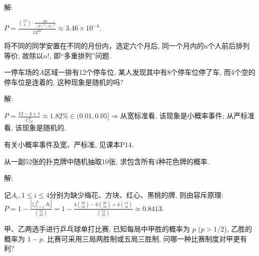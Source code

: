 \documentclass[standard]{ExBook}
\renewenvironment{shaded}{%
  \def\FrameCommand{\fboxsep=\FrameSep \colorbox{shadecolor}}%
  \MakeFramed{\advance\hsize-\width \FrameRestore}%
}{%
  \endMakeFramed
}
\begin{document}
\begin{qitems}
\vspace{\dimexpr2.5cm-5em\relax}

解:

$P=\displaystyle{\frac{\binom{12}{6}\cdot\frac{30!}{(2!)^6 (3!)^6}}{12^{30}}}\approx3.46\times10^{-4}$.

\textcolor{themeColor}{\selectfont {} 将不同的同学安置在不同的月份内，选定六个月后, 同一个月内的n个人前后排列等价, 故除以$n!$, 即“多重排列”问题.}

\vspace{2.5cm-5em}

    \begin{bbox}
    \begin{shaded}
        \qitem
一停车场的$A$区域一排有12个停车位, 某人发现其中有8个停车位停了车, 而4个空的停车位是连着的, 这种现象是随机的吗?
    \end{shaded}
    \end{bbox}

\vspace{\dimexpr2.5cm-5em\relax}

解:

$P=\displaystyle{\frac{12-4+1}{C_{12}^{4}}}\approx1.82\%\in(0.01,0.05]$$\Longrightarrow$从宽标准看, 该现象是小概率事件; 从严标准看, 该现象是随机的.

\textcolor{themeColor}{\selectfont {} 有关小概率事件及宽、严标准, 见课本P14.}

\vspace{2.5cm-5em}

    \begin{bbox}
    \begin{shaded}
        \qitem
从一副52张的扑克牌中随机抽取10张, 求包含所有4种花色牌的概率.
    \end{shaded}
    \end{bbox}

\vspace{\dimexpr2.5cm-5em\relax}

解: 

记$A_{i},1\leq i\leq4$分别为缺少梅花、方块、红心、黑桃的牌, 则由容斥原理: $P=1-\frac{\left|\bigcup\limits_{i=1}^{4}A_{i}\right|}{\binom{52}{10}}=1-\frac{4\binom{39}{10}-6\binom{26}{10}+4\binom{13}{10}}{\binom{52}{10}}\approx0.8413$.

\vspace{2.5cm-5em}

    \begin{bbox}
    \begin{shaded}
        \qitem
甲、乙两选手进行乒乓球单打比赛, 已知每局中甲胜的概率为 $p$ ($p > 1/2$), 乙胜的概率为 $1 - p$. 比赛可采用三局两胜制或五局三胜制, 问哪一种比赛制度对甲更有利?
    \end{shaded}
    \end{bbox}


\end{qitems}
\end{document}
